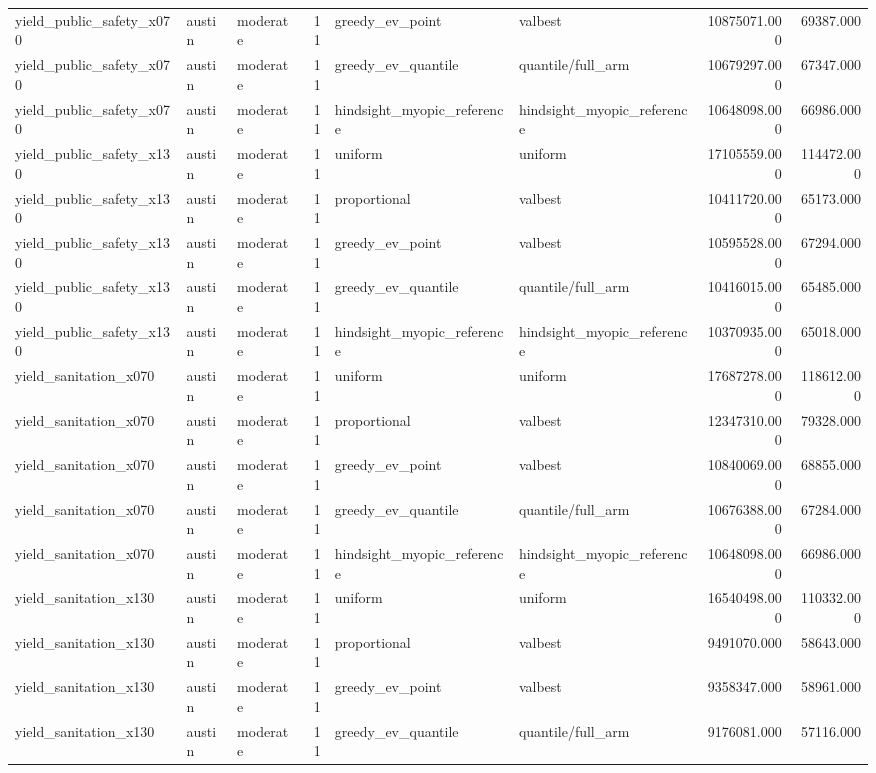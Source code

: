 \begin{tabular}{lllrllrr}
yield\_public\_safety\_x070 & austin & moderate & 11 & greedy\_ev\_point & valbest & 10875071.000 & 69387.000 \\
yield\_public\_safety\_x070 & austin & moderate & 11 & greedy\_ev\_quantile & quantile/full\_arm & 10679297.000 & 67347.000 \\
yield\_public\_safety\_x070 & austin & moderate & 11 & hindsight\_myopic\_reference & hindsight\_myopic\_reference & 10648098.000 & 66986.000 \\
yield\_public\_safety\_x130 & austin & moderate & 11 & uniform & uniform & 17105559.000 & 114472.000 \\
yield\_public\_safety\_x130 & austin & moderate & 11 & proportional & valbest & 10411720.000 & 65173.000 \\
yield\_public\_safety\_x130 & austin & moderate & 11 & greedy\_ev\_point & valbest & 10595528.000 & 67294.000 \\
yield\_public\_safety\_x130 & austin & moderate & 11 & greedy\_ev\_quantile & quantile/full\_arm & 10416015.000 & 65485.000 \\
yield\_public\_safety\_x130 & austin & moderate & 11 & hindsight\_myopic\_reference & hindsight\_myopic\_reference & 10370935.000 & 65018.000 \\
yield\_sanitation\_x070 & austin & moderate & 11 & uniform & uniform & 17687278.000 & 118612.000 \\
yield\_sanitation\_x070 & austin & moderate & 11 & proportional & valbest & 12347310.000 & 79328.000 \\
yield\_sanitation\_x070 & austin & moderate & 11 & greedy\_ev\_point & valbest & 10840069.000 & 68855.000 \\
yield\_sanitation\_x070 & austin & moderate & 11 & greedy\_ev\_quantile & quantile/full\_arm & 10676388.000 & 67284.000 \\
yield\_sanitation\_x070 & austin & moderate & 11 & hindsight\_myopic\_reference & hindsight\_myopic\_reference & 10648098.000 & 66986.000 \\
yield\_sanitation\_x130 & austin & moderate & 11 & uniform & uniform & 16540498.000 & 110332.000 \\
yield\_sanitation\_x130 & austin & moderate & 11 & proportional & valbest & 9491070.000 & 58643.000 \\
yield\_sanitation\_x130 & austin & moderate & 11 & greedy\_ev\_point & valbest & 9358347.000 & 58961.000 \\
yield\_sanitation\_x130 & austin & moderate & 11 & greedy\_ev\_quantile & quantile/full\_arm & 9176081.000 & 57116.000 \\

\end{tabular}
